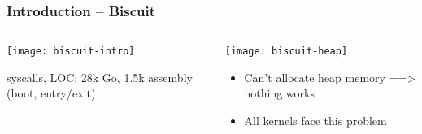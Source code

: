 \begin{frame}[plain]
	\frametitle{Introduction -- Biscuit}
	
	\begin{columns}
		
		\begin{column}{.4\textwidth}
			
			\texttt{[image: biscuit-intro]}
			
			 syscalls, LOC: 28k Go,
			1.5k assembly (boot, entry/exit)
			
		\end{column}
		
		\begin{column}{.6\textwidth}
			\texttt{[image: biscuit-heap]}
			\begin{itemize}
				\item Can’t allocate heap memory ==> nothing works
				\item All kernels face this problem

			\end{itemize}
		\end{column}
	\end{columns}	
\end{frame}

